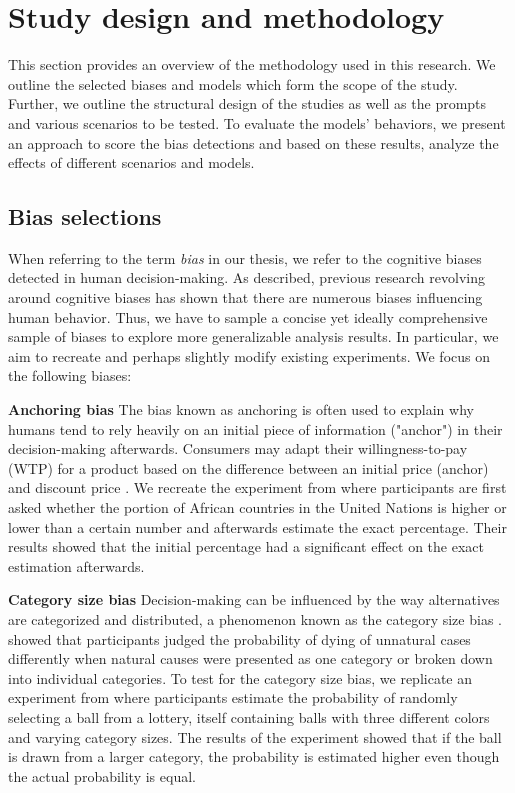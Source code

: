 \section{Study design and methodology}
\label{chapter:methodology}

\par This section provides an overview of the methodology used in this research. We outline the selected biases and models which form the scope of the study. Further, we outline the structural design of the studies as well as the prompts and various scenarios to be tested. To evaluate the models' behaviors, we present an approach to score the bias detections and based on these results, analyze the effects of different scenarios and models.


\subsection{Bias selections}
\par When referring to the term \textit{bias} in our thesis, we refer to the cognitive biases detected in human decision-making. As described, previous research revolving around cognitive biases has shown that there are numerous biases influencing human behavior. Thus, we have to sample a concise yet ideally comprehensive sample of biases to explore more generalizable analysis results. In particular, we aim to recreate and perhaps slightly modify existing experiments. We focus on the following biases:

\setlength{\parindent}{20pt}
\par \textbf{Anchoring bias} The bias known as anchoring is often used to explain why humans tend to rely heavily on an initial piece of information ("anchor") in their decision-making afterwards. Consumers may adapt their willingness-to-pay (WTP) for a product based on the difference between an initial price (anchor) and discount price \parencite{chandrashekaran2006anchoring}. We recreate the experiment from \textcite{tversky1974judgment} where participants are first asked whether the portion of African countries in the United Nations is higher or lower than a certain number and afterwards estimate the exact percentage. Their results showed that the initial percentage had a significant effect on the exact estimation afterwards.

\par \textbf{Category size bias} Decision-making can be influenced by the way alternatives are categorized and distributed, a phenomenon known as the category size bias \parencite{isaac2014judging}. \textcite{tversky1994support} showed that participants judged the probability of dying of unnatural cases differently when natural causes were presented as one category or broken down into individual categories. To test for the category size bias, we replicate an experiment from \textcite{isaac2014judging} where participants estimate the probability of randomly selecting a ball from a lottery, itself containing balls with three different colors and varying category sizes. The results of the experiment showed that if the ball is drawn from a larger category, the probability is estimated higher even though the actual probability is equal.

